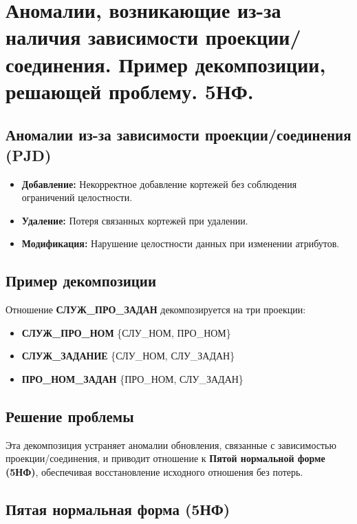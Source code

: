 \documentclass[a4paper,12pt]{article}
\begin{document}
\section{Аномалии, возникающие из-за наличия зависимости проекции/соединения. Пример декомпозиции, решающей проблему. 5НФ.}

\subsection{Аномалии из-за зависимости проекции/соединения (PJD)}

\begin{itemize}
    \item \textbf{Добавление:} Некорректное добавление кортежей без соблюдения ограничений целостности.
    \item \textbf{Удаление:} Потеря связанных кортежей при удалении.
    \item \textbf{Модификация:} Нарушение целостности данных при изменении атрибутов.
\end{itemize}

\subsection{Пример декомпозиции}

Отношение \textbf{СЛУЖ\_ПРО\_ЗАДАН} декомпозируется на три проекции:
\begin{itemize}
    \item \textbf{СЛУЖ\_ПРО\_НОМ} \{СЛУ\_НОМ, ПРО\_НОМ\}
    \item \textbf{СЛУЖ\_ЗАДАНИЕ} \{СЛУ\_НОМ, СЛУ\_ЗАДАН\}
    \item \textbf{ПРО\_НОМ\_ЗАДАН} \{ПРО\_НОМ, СЛУ\_ЗАДАН\}
\end{itemize}

\subsection{Решение проблемы}

Эта декомпозиция устраняет аномалии обновления, связанные с зависимостью проекции/соединения, и приводит отношение к \textbf{Пятой нормальной форме (5НФ)}, обеспечивая восстановление исходного отношения без потерь.

\subsection{Пятая нормальная форма (5НФ)}
\end{document}
